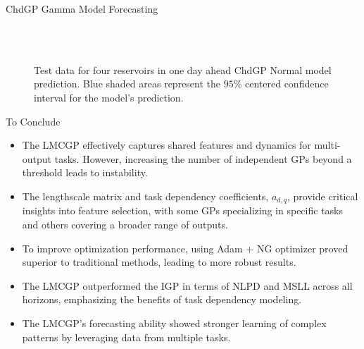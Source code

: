 \begin{frame}{ChdGP Gamma Model Forecasting}
	\centering
	\begin{figure}[htbp]
		\tiny
		\setlength{} 
		\setlength{}
		
		\subfloat[$T.$]{}\hfill
		\subfloat[$A.$]{}\\[-0.5cm]
		\subfloat[$I.$]{}\hfill
		\subfloat[$O.$]{}\\[-0.4cm]
		
		\caption{Test data for four reservoirs in one day ahead ChdGP Normal model prediction. Blue shaded areas represent the $95\%$ centered confidence interval for the model's prediction.}
	\end{figure}
\end{frame}

\begin{frame}{To Conclude}
	
	\begin{itemize}
		\justifying
		\item The LMCGP effectively captures shared features and dynamics for multi-output tasks. However, increasing the number of independent GPs beyond a threshold leads to instability.
		\item The lengthscale matrix and task dependency coefficients, $a_{d,q}$, provide critical insights into feature selection, with some GPs specializing in specific tasks and others covering a broader range of outputs.
		\item To improve optimization performance, using Adam + NG optimizer proved superior to traditional methods, leading to more robust results.
		\item The LMCGP outperformed the IGP in terms of NLPD and MSLL across all horizons, emphasizing the benefits of task dependency modeling.
		\item The LMCGP's forecasting ability showed stronger learning of complex patterns by leveraging data from multiple tasks.
	\end{itemize}
\end{frame}
